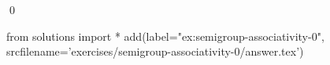 
\begin{ex} 
  \label{ex:semigroup-associativity-0}
  
  \qed
\end{ex} 
\begin{python0}
from solutions import *
add(label="ex:semigroup-associativity-0",
    srcfilename='exercises/semigroup-associativity-0/answer.tex') 
\end{python0}
